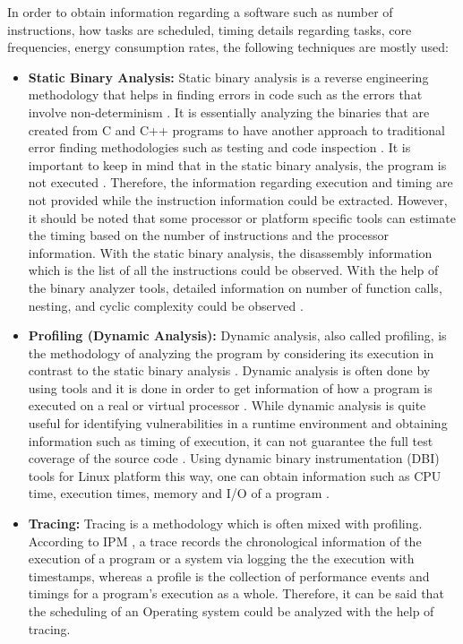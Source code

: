 In order to obtain information regarding a software such as number of instructions, how tasks are scheduled, timing details regarding tasks, core frequencies, energy consumption rates, the following techniques are mostly used:
\begin{itemize}
	\item \textbf{Static Binary Analysis:} Static binary analysis is a reverse engineering methodology that helps in finding errors in code such as the errors that involve non-determinism \cite{staticanalysisPRE}. It is essentially analyzing the binaries that are created from C and C++ programs to have another approach to traditional error finding methodologies such as testing and code inspection \cite{staticanalysisPRE}. It is important to keep in mind that in the static binary analysis, the program is not executed \cite{dynamicanalysisphd}. Therefore, the information regarding execution and timing are not provided while the instruction information could be extracted. However, it should be noted that some processor or platform specific tools can estimate the timing based on the number of instructions and the processor information. With the static binary analysis, the disassembly information which is the list of all the instructions could be observed. With the help of the binary analyzer tools, detailed information on number of function calls, nesting, and cyclic complexity could be observed \cite{staticvsdynamicanalysis}. %
	\item \textbf{Profiling (Dynamic Analysis):}
	Dynamic analysis, also called profiling, is the methodology of analyzing the program by considering its execution in contrast to the static binary analysis \cite{dynamicanalysisphd}. Dynamic analysis is often done by using tools and it is done in order to get information of how a program is executed on a real or virtual processor \cite{staticvsdynamicanalysis}. While dynamic analysis is quite useful for identifying vulnerabilities in a runtime environment and obtaining information such as timing of execution, it can not guarantee the full test coverage of the source code \cite{staticvsdynamicanalysis}. Using dynamic binary instrumentation (DBI) tools for Linux platform this way, one can obtain information such as CPU time, execution times, memory and I/O of a program \cite{dynamicanalysisphd}. 
	\item \textbf{Tracing:} Tracing is a methodology which is often mixed with profiling. According to IPM \cite{IPM}, a trace records the chronological information of the execution of a program or a system via logging the the execution with timestamps, whereas a profile is the collection of performance events and timings for a program's execution as a whole. Therefore, it can be said that the scheduling of an Operating system could be analyzed with the help of tracing. 
	

\end{itemize}
